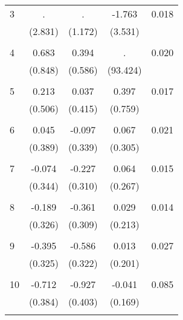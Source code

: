\begin{tabular}{l*{1}{cccc}}
\hline\hline
\hline
   3       &     . &     . & -1.763 & 0.018 \\
          & (2.831) & (1.172) & (3.531) & \\
 & & & &\\
   4       & 0.683 & 0.394 &     . & 0.020 \\
          & (0.848) & (0.586) & (93.424) & \\
 & & & &\\
   5       & 0.213 & 0.037 & 0.397 & 0.017 \\
          & (0.506) & (0.415) & (0.759) & \\
 & & & &\\
   6       & 0.045 & -0.097 & 0.067 & 0.021 \\
          & (0.389) & (0.339) & (0.305) & \\
 & & & &\\
   7       & -0.074 & -0.227 & 0.064 & 0.015 \\
          & (0.344) & (0.310) & (0.267) & \\
 & & & &\\
   8       & -0.189 & -0.361 & 0.029 & 0.014 \\
          & (0.326) & (0.309) & (0.213) & \\
 & & & &\\
   9       & -0.395 & -0.586 & 0.013 & 0.027 \\
          & (0.325) & (0.322) & (0.201) & \\
 & & & &\\
  10       & -0.712 & -0.927 & -0.041 & 0.085 \\
          & (0.384) & (0.403) & (0.169) & \\
 & & & &\\
\hline\hline
\end{tabular}
